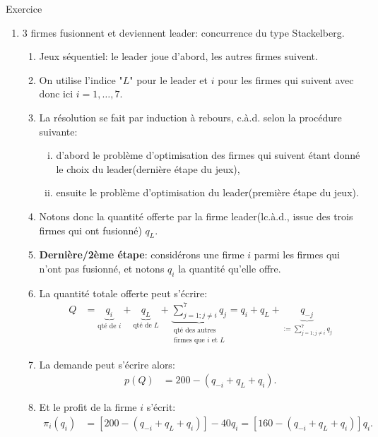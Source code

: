 \begin{frame}[allowframebreaks]{Exercice}
\begin{enumerate}
        \item 3 firmes fusionnent et deviennent leader: concurrence du type Stackelberg. 
        \begin{enumerate}[$\star$]
            \item Jeux séquentiel: le leader joue d'abord, les autres firmes suivent. 
            \item On utilise l'indice "$L$" pour le leader et $i$ pour les firmes qui suivent avec donc 
            ici $i=1, \ldots, 7$.
            \item La résolution  se fait par induction à rebours, c.à.d. selon la procédure suivante:
            \begin{enumerate}[(i)]
            \item d'abord le problème d'optimisation des firmes qui suivent étant donné le choix du leader(dernière étape du jeux),
            \item ensuite le problème d'optimisation du leader(première étape du jeux).
            \end{enumerate}
            \item Notons donc la quantité offerte par la firme leader(lc.à.d., issue des trois firmes qui ont fusionné) $q_L$. 
            \item \textbf{Dernière/2ème étape}: considérons une firme $i$ parmi les firmes qui n'ont pas fusionné, 
            et notons $q_i$ la quantité qu'elle offre. 
            \item La quantité totale offerte peut s'écrire:
            \begin{align*}
                Q&= \underbrace{q_i}_{\text{qté de $i$}} + \underbrace{q_L}_{\text{qté de $L$}} 
                + \underbrace{\sum_{j=1; j\neq i}^7 q_j}_{\substack{\text{qté des autres}\\ \text{firmes que $i$ et $L$}}}
                 =  q_i + q_L + \underbrace{q_{-j}}_{:=\sum_{j=1; j\neq i}^7 q_j}
            \end{align*}
            \item La demande peut s'écrire alors:
            \begin{align*}
                p(Q) &= 200 - ( q_{-i} + q_L + q_i ).
            \end{align*}
            \item Et le profit de la firme $i$ s'écrit:
            \begin{align*}
                \pi_i(q_i) &= \left[200 - (q_{-i} + q_L + q_i ) \right] - 40q_i = \left[160 - ( q_{-i} + q_L + q_i )\right]q_i.

\end{align*}
\end{enumerate}
\end{enumerate}
\end{frame}
